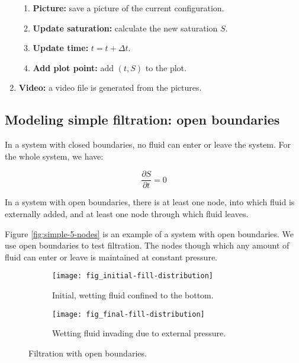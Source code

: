 \begin{enumerate}
\begin{enumerate}
			\item \textbf{Picture:} save a picture of the current configuration.
			
			\item \textbf{Update saturation:} calculate the new saturation $S$.
			
			\item \textbf{Update time:} $t = t + \Delta t$.
			
			\item \textbf{Add plot point:} add $(t, S)$ to the plot.
		\end{enumerate}
		
		\item \textbf{Video:} a video file is generated from the pictures.	
	\end{enumerate}

		
\subsection{Modeling simple filtration: open boundaries} \label{sec:model-filtration}
	In a system with closed boundaries, no fluid can enter or leave the system. For the whole system, we have:
	
	\begin{equation}
		\frac{\partial S}{\partial t} = 0
	\end{equation}
	
	In a system with open boundaries, there is at least one node, into which fluid is externally added, and at least one node through which fluid leaves.
	
	Figure \ref{fig:simple-5-nodes} is an example of a system with open boundaries. We use open boundaries to test filtration. The nodes though which any amount of fluid can enter or leave is maintained at constant pressure.
	
	\begin{figure}[H]
		\centering
		\begin{subfigure}{0.47\textwidth}
			\centering
			\texttt{[image: fig\_initial-fill-distribution]}
			\caption{Initial, wetting fluid confined to the bottom.}
			\label{fig:plot-sat-vs-time-disp-one}
		\end{subfigure}
		\begin{subfigure}{0.47\textwidth}
			\centering
			\texttt{[image: fig\_final-fill-distribution]}
			\caption{Wetting fluid invading due to external pressure.}
			\label{fig:plot-sat-vs-time-disp-two}
		\end{subfigure}
		\caption{Filtration with open boundaries.}
	\end{figure}
		
